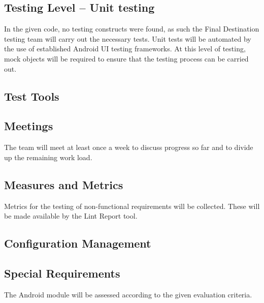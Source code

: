 \subsection{Testing Level -- Unit testing}
In the given code, no testing constructs were found, as such the Final Destination testing team will carry out the necessary tests.
Unit tests will be automated by the use of established Android UI testing frameworks. At this level of testing, mock objects will be required to ensure that the testing process can be carried out.

\subsection{Test Tools}


\subsection{Meetings}
The team will meet at least once a week to discuss progress so far and to divide up the remaining work load.

\subsection{Measures and Metrics}
Metrics for the testing of non-functional requirements will be collected. These will be made available by the Lint Report tool.

\subsection{Configuration Management}


\subsection{Special Requirements}
The Android module will be assessed according to the given evaluation criteria.

